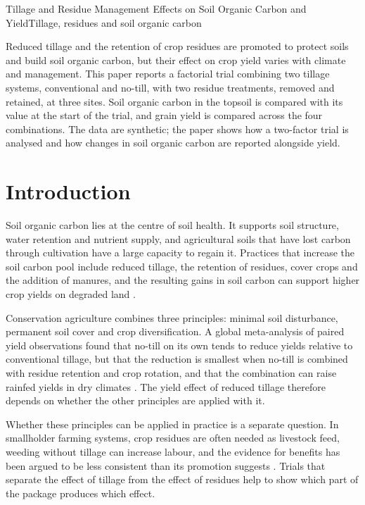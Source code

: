 \documentclass[../main.tex]{subfiles}
\begin{document}
\begin{paper}{Tillage and Residue Management Effects on Soil Organic Carbon and Yield}{Tillage, residues and soil organic carbon}
\label{paper:tillage}

\begin{paperabstract}
Reduced tillage and the retention of crop residues are promoted to protect
soils and build soil organic carbon, but their effect on crop yield varies
with climate and management. This paper reports a factorial trial combining
two tillage systems, conventional and no-till, with two residue treatments,
removed and retained, at three sites. Soil organic carbon in the topsoil is
compared with its value at the start of the trial, and grain yield is compared
across the four combinations. The data are synthetic; the paper shows how a
two-factor trial is analysed and how changes in soil organic carbon are
reported alongside yield.
\end{paperabstract}

\section{Introduction}

Soil organic carbon lies at the centre of soil health. It supports soil
structure, water retention and nutrient supply, and agricultural soils that
have lost carbon through cultivation have a large capacity to regain it.
Practices that increase the soil carbon pool include reduced tillage, the
retention of residues, cover crops and the addition of manures, and the
resulting gains in soil carbon can support higher crop yields on degraded
land \parencite{lal2004}.

Conservation agriculture combines three principles: minimal soil disturbance,
permanent soil cover and crop diversification. A global meta-analysis of
paired yield observations found that no-till on its own tends to reduce
yields relative to conventional tillage, but that the reduction is smallest
when no-till is combined with residue retention and crop rotation, and that
the combination can raise rainfed yields in dry climates
\parencite{pittelkow2015}. The yield effect of reduced tillage therefore
depends on whether the other principles are applied with it.

Whether these principles can be applied in practice is a separate question.
In smallholder farming systems, crop residues are often needed as livestock
feed, weeding without tillage can increase labour, and the evidence for
benefits has been argued to be less consistent than its promotion suggests
\parencite{giller2009}. Trials that separate the effect of tillage from the
effect of residues help to show which part of the package produces which
effect.


\end{paper}
\end{document}
